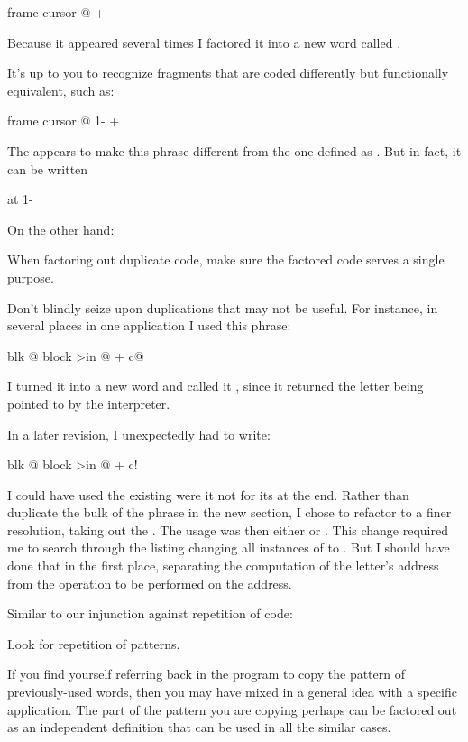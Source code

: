 \begin{Code}
frame  cursor @ +
\end{Code}
Because it appeared several times I factored it into a new word called
.

It's up to you to recognize fragments that are coded differently but
functionally equivalent, such as:

\begin{Code}
frame  cursor @ 1-  +
\end{Code}
The  appears to make this phrase different from the one defined as
. But in fact, it can be written

\begin{Code}
at 1-
\end{Code}
On the other hand:

\begin{tip}
When factoring out duplicate code, make sure the factored code serves
a single purpose.
\end{tip}
Don't blindly seize upon duplications that may not be useful. For
instance, in several places in one application I used this phrase:

\begin{Code}
blk @ block  >in @ +  c@
\end{Code}
I turned it into a new word and called it , since it
returned the letter being pointed to by the interpreter.

In a later revision, I unexpectedly had to write:

\begin{Code}
blk @ block  >in @ +  c!
\end{Code}
I could have used the existing  were it not for its
 at the end. Rather than duplicate the bulk of the phrase
in the new section, I chose to refactor  to a finer
resolution, taking out the .  The usage was then either
 or . This change required me to
search through the listing changing all instances of  to
.  But I should have done that in the first place,
separating the computation of the letter's address from the operation
to be performed on the address.

Similar to our injunction against repetition of code:

\begin{tip}
Look for repetition of patterns.
\end{tip}
If you find yourself referring back in the program to copy the pattern
of previously-used words, then you may have mixed in a general idea
with a specific application. The part of the pattern you are copying
perhaps can be factored out as an independent definition that can be
used in all the similar cases.

